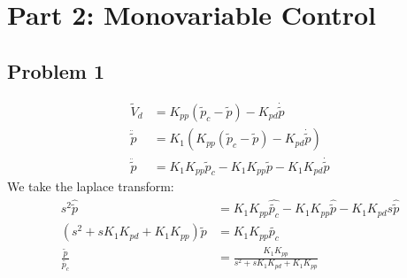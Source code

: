 \section{Part 2: Monovariable Control}

\subsection{Problem 1}

\begin{subequations}
		\begin{align*}
		\tilde V_d &= K_{pp} (\tilde p_c - \tilde p) - K_{pd} \dot {\tilde {p}}\\
		\ddot {\tilde p} &= K_1 (K_{pp} (\tilde p_c - \tilde p) - K_{pd} \dot {\tilde {p}})\\
		\ddot {\tilde p} &= K_1 K_{pp} \tilde p_c - K_1 K_{pp} \tilde p - K_1 K_{pd} \dot {\tilde p}
		\end{align*}	
\end{subequations}
We take the laplace transform:
\begin{subequations}
		\begin{align*}
		s^2 \hat{\tilde{p}} &= K_1 K_{pp} \hat{\tilde {p_c}} - K_1 K_{pp} \hat{\tilde p} - K_1 K_{pd} s \hat {\tilde p} \\
		(s^2 + s K_1 K_{pd} + K_1 K_{pp})\tilde{p} &= K_1 K_{pp} \tilde{p_c} \\
		\frac{\tilde{p}}{\tilde {p_c}} &= \frac{K_1 K_{pp}}{s^2 + s K_1 K_{pd} + K_1 K_{pp}}
		\end{align*}	
\end{subequations}